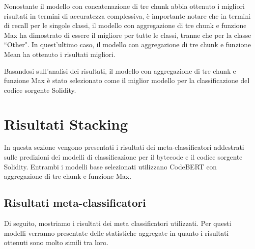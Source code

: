 \documentclass[../../Thesis.tex]{subfiles}
\begin{document}
Nonostante il modello con concatenazione di tre chunk abbia ottenuto i migliori risultati in termini di accuratezza complessiva, \`e importante notare che in termini di recall per le singole classi, il modello con aggregazione di tre chunk e funzione Max ha dimostrato di essere il migliore per tutte le classi, tranne che per la classe ``Other". In quest'ultimo caso, il modello con aggregazione di tre chunk e funzione Mean ha ottenuto i risultati migliori.

Basandosi sull'analisi dei risultati, il modello con aggregazione di tre chunk e funzione Max \`e stato selezionato come il miglior modello per la classificazione del codice sorgente Solidity. 

\section{Risultati Stacking}
In questa sezione vengono presentati i risultati dei meta-classificatori addestrati sulle predizioni dei modelli di classificazione per il bytecode e il codice sorgente Solidity. Entrambi i modelli base selezionati utilizzano CodeBERT con aggregazione di tre chunk e funzione Max.\\

\subsection{Risultati meta-classificatori}
Di seguito, mostriamo i risultati dei meta classificatori utilizzati. Per questi modelli verranno presentate delle statistiche aggregate in quanto i risultati ottenuti sono molto simili tra loro.\\
\end{document}
